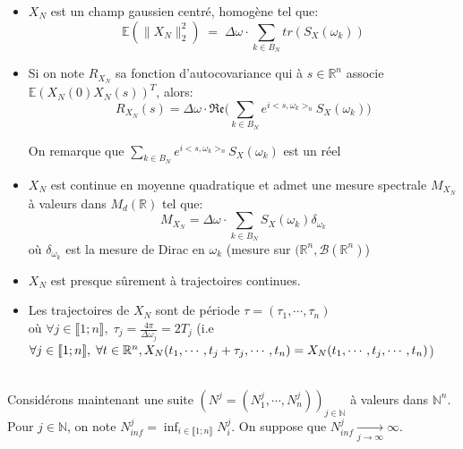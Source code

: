 \begin{itemize}
  \item $X_N$ est un champ gaussien centré, homogène tel que:
   \begin{equation}
    \mathbb{E}(\|X_N\|_{2}^{2}) \; = \; \Delta \omega \cdot \displaystyle\sum_{k \in B_N} tr(S_X(\omega_k))    
   \end{equation}

 \item Si on note $R_{X_N}$ sa fonction d'autocovariance qui à $s \in \mathbb{R}^n$ associe $\mathbb{E}(X_N(0)X_N(s))^{T}$, alors:
   \begin{equation}
    R_{X_N}(s) = \Delta\omega \cdot \mathfrak{Re}\biggl (\displaystyle\sum_{k \in B_N} e^{i<s,\omega_k>_n}S_X(\omega_k)\biggr)  \label{autocov}  
   \end{equation}

   \noindent On remarque que $\displaystyle\sum_{k \in B_N} e^{i<s,\omega_k>_n}S_X(\omega_k)$ est un réel \\

 \item $X_N$ est continue en moyenne quadratique et admet une mesure spectrale $M_{X_N}$ à valeurs dans $M_d(\mathbb{R})$ tel que:
   \begin{equation}
     M_{X_N} = \Delta\omega \cdot \displaystyle\sum_{k \in B_N} S_X(\omega_k)\delta_{\omega_k} \label{mesSpec}
   \end{equation}
   où $\delta_{\omega_k}$ est la mesure de Dirac en $\omega_k$ (mesure sur $(\mathbb{R}^n,\mathcal{B}(\mathbb{R}^n)$)\\

 \item $X_N$ est presque sûrement à trajectoires continues.\\

 \item Les trajectoires de $X_N$ sont de période $\tau = (\tau_1, \cdots, \tau_n)$\\
   où $\forall j \in \llbracket 1;n \rrbracket, \; \tau_j = \frac{4\pi}{\Delta \omega_j} = 2T_j$
   (i.e $\forall j \in \llbracket 1;n \rrbracket, \; \forall t \in \mathbb{R}^n, \; \\ X_N(t_1, \cdots, t_j + \tau_j, \cdots, t_n) = X_N(t_1, \cdots, t_j, \cdots, t_n)$)
\end{itemize}
~\\

Considérons maintenant une suite $( N^{j} = (N_1^{j}, \cdots, N_n^{j}))_{j \in \mathbb{N}}$ à valeurs dans $\mathbb{N}^n$. Pour $j \in \mathbb{N}$, on note $N_{inf}^{j} = \displaystyle\inf_{i \in \llbracket 1;n \rrbracket} N_i^{j}$. On suppose que $N_{inf}^{j} \underset{j \to \infty}{\to} \infty$.\\

